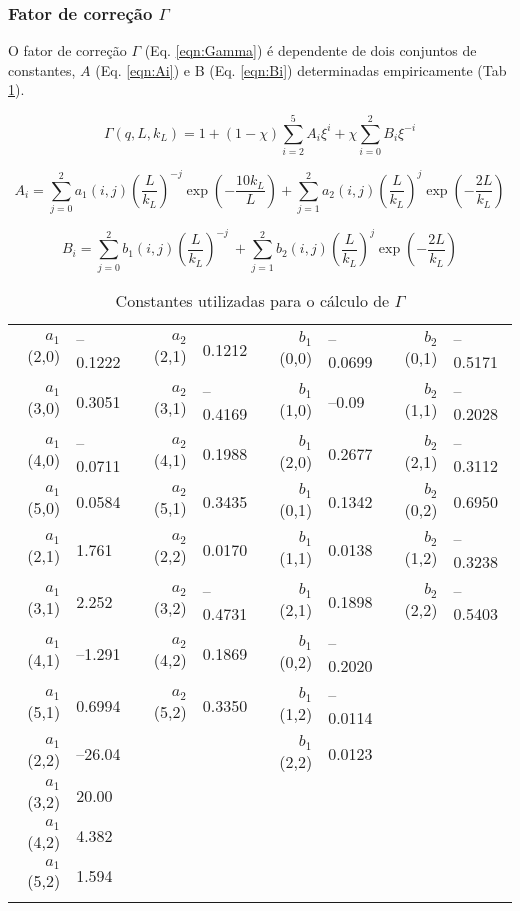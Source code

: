 \begin{apendicesenv}
	\subsubsection{Fator de correção $\Gamma$}
	
	O fator de correção $\Gamma$ (Eq. \ref{eqn:Gamma}) é dependente de dois conjuntos de constantes, $A$ (Eq. \ref{eqn:Ai}) e B (Eq. \ref{eqn:Bi}) determinadas empiricamente (Tab \ref{tab_ap:AiBi}).
	
	\begin{equation}
	\Gamma\left( q,L,k_{L} \right) = 1 + \left( 1 - \chi \right)\sum_{i = 2}^{5}{A_{i}\xi^{i}} + \chi\sum_{i = 0}^{2}{B_{i}\xi^{- i}}
	\label{eqn:Gamma}
	\end{equation}
	
	\begin{equation}
	A_{i} = \sum_{j = 0}^{2}{a_{1}\left( i,j \right)\left( \frac{L}{k_{L}} \right)^{- j}\exp\left( - \frac{10k_{L}}{L} \right)} + \sum_{j = 1}^{2}{a_{2}\left( i,j \right)\left( \frac{L}{k_{L}} \right)^{j}\exp\left( - \frac{2L}{k_{L}} \right)}
	\label{eqn:Ai}
	\end{equation}
	
	\begin{equation}
	B_{i} = \sum_{j = 0}^{2}{b_{1}\left( i,j \right)\left( \frac{L}{k_{L}} \right)^{- j}\ } + \sum_{j = 1}^{2}{b_{2}\left( i,j \right)\left( \frac{L}{k_{L}} \right)^{j}\exp\left( - \frac{2L}{k_{L}} \right)}
	\label{eqn:Bi}
	\end{equation}
	
	\begin{longtable}[c]{r l | r l | r l | r l}
		\toprule
		\endhead
		$a_1$(2,0) & --0.1222 & $a_2$(2,1) & 0.1212 & $b_1$(0,0) &
		--0.0699 & $b_2$(0,1) & --0.5171\\
		$a_1$(3,0) & 0.3051 & $a_2$(3,1) & --0.4169 & $b_1$(1,0) & --0.09
		& $b_2$(1,1) & --0.2028\\
		$a_1$(4,0) & --0.0711 & $a_2$(4,1) & 0.1988 & $b_1$(2,0) &
		0.2677 & $b_2$(2,1) & --0.3112\\
		$a_1$(5,0) & 0.0584 & $a_2$(5,1) & 0.3435 & $b_1$(0,1) & 0.1342
		& $b_2$(0,2) & 0.6950\\
		$a_1$(2,1) & 1.761 & $a_2$(2,2) & 0.0170 & $b_1$(1,1) & 0.0138 &
		$b_2$(1,2) & --0.3238\\
		$a_1$(3,1) & 2.252 & $a_2$(3,2) & --0.4731 & $b_1$(2,1) & 0.1898
		& $b_2$(2,2) & --0.5403\\
		$a_1$(4,1) & --1.291 & $a_2$(4,2) & 0.1869 & $b_1$(0,2) & --0.2020
		& &\\
		$a_1$(5,1) & 0.6994 & $a_2$(5,2) & 0.3350 & $b_1$(1,2) & --0.0114
		& &\\
		$a_1$(2,2) & --26.04 & & & $b_1$(2,2) & 0.0123 & &\\
		$a_1$(3,2) & 20.00 & & & & & &\\
		$a_1$(4,2) & 4.382 & & & & & &\\
		$a_1$(5,2) & 1.594 & & & & & &\\
		\bottomrule
		\caption{Constantes utilizadas para o cálculo de $\Gamma$}
		\label{tab_ap:AiBi}
	\end{longtable}
	

\end{apendicesenv}
